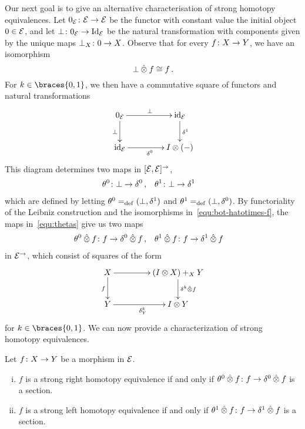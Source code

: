 \documentclass[reqno,10pt,a4paper,oneside,draft]{amsart}
\begin{document}
Our next goal is to give an alternative characterisation of strong homotopy equivalences.
Let $0_{\mathcal{E}} \colon \mathcal{E} \to \mathcal{E}$ be the functor with constant value the initial object $0 \in \mathcal{E}$, and let $\bot \colon 0_{\mathcal{E}} \rightarrow \operatorname{Id}_{\mathcal{E}}$ be the natural transformation with components given by the unique maps $\bot_X \colon 0 \to X$.
Observe that for every $f \colon X \to Y$, we have an isomorphism
\begin{equation}
\label{equ:bot-hatotimes-f}
\bot \mathbin{\hat{\otimes}} f \cong f \, .
\end{equation}
For $k \in \braces{0, 1}$, we then have a commutative square of functors and natural transformations
\[
\xymatrix@C+2em{
  0_\catE \ar[r]^{\bot} \ar[d]_{\bot} & \id_\catE \ar[d]^{\rcyl} \\
  \id_\catE \ar[r]_{\lcyl} & \interval \otimes (-)
}
\]
This diagram determines two maps in $[\mathcal{E}, \mathcal{E}]^\to$,
\begin{equation} \label{equ:thetas}
\begin{aligned}
  \theta^{0} &\colon \bot \rightarrow \delta^0
\, ,&
  \theta^{1} &\colon \bot \rightarrow \delta^1
\end{aligned}
\end{equation}
which are defined by letting $\theta^{0} =_{\operatorname{def}} (\bot, \delta^1)$ and $\theta^{1} =_{\operatorname{def}} (\bot, \delta^0)$.
By functoriality of the Leibniz construction and the isomorphisms in~\eqref{equ:bot-hatotimes-f}, the maps in~\eqref{equ:thetas} give us two maps
\begin{equation*}
\begin{aligned}
  \theta^{0} \mathbin{\hat{\otimes}} f &\colon f \to \delta^0 \mathbin{\hat{\otimes}} f
\, ,&
  \theta^{1} \mathbin{\hat{\otimes}} f &\colon f \to \delta^1 \mathbin{\hat{\otimes}} f
\end{aligned}
\end{equation*}
in $\mathcal{E}^\to$, which consist of squares of the form
\[
\xymatrix@C+2em{
  X \ar[r] \ar[d]_{f} & (\interval \otimes X) +_{X} Y \ar[d]^{\kcyl \hatotimes f} \\
  Y \ar[r]_{\kcyl_Y} & \interval \otimes Y
}
\]
for $k \in \braces{0, 1}$.
We can now provide a characterization of strong homotopy equivalences.

\begin{proposition} \label{strong-h-equiv-as-section}
Let $f \colon X \to Y$ be a morphism in $\mathcal{E}$.
\begin{enumerate}[(i)]
\item $f$ is a strong right homotopy equivalence if and only if $\theta^{0} \mathbin{\hat{\otimes}} f \colon f \rightarrow \delta^0 \mathbin{\hat{\otimes}} f$ is a section.
\item $f$ is a strong left homotopy equivalence if and only if $\theta^{1} \mathbin{\hat{\otimes}} f \colon f \rightarrow \delta^1 \mathbin{\hat{\otimes}} f$ is a section.
\end{enumerate}
\end{proposition}
\end{document}
